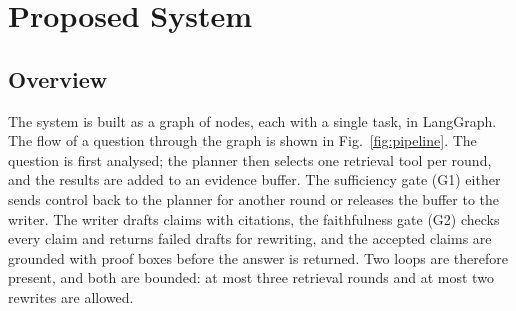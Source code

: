 \section{Proposed System}
\label{sec:method}

\subsection{Overview}

The system is built as a graph of nodes, each with a single task, in
LangGraph. The flow of a question through the graph is shown in
Fig.~\ref{fig:pipeline}. The question is first analysed; the planner then selects one
retrieval tool per round, and the results are added to an evidence buffer. The
sufficiency gate (G1) either sends control back to the planner for another round or
releases the buffer to the writer. The writer drafts claims with citations, the
faithfulness gate (G2) checks every claim and returns failed drafts for rewriting, and
the accepted claims are grounded with proof boxes before the answer is returned. Two
loops are therefore present, and both are bounded: at most three retrieval rounds and
at most two rewrites are allowed.

